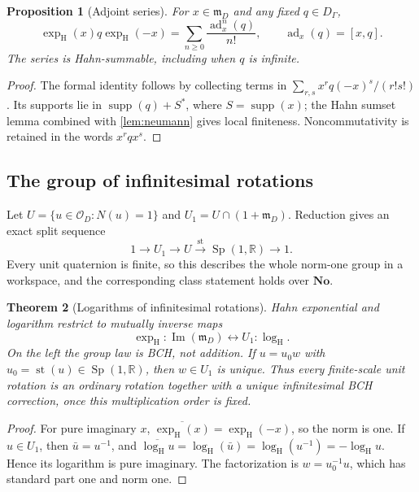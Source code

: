 \documentclass[11pt,letterpaper]{article}
\newtheorem{theorem}{Theorem}[section]
\newtheorem{proposition}[theorem]{Proposition}
\theoremstyle{definition}
\newcommand{\No}{\mathbf{No}}
\newcommand{\R}{\mathbb R}
\newcommand{\OO}{\mathcal O}
\newcommand{\mm}{\mathfrak m}
\DeclareMathOperator{\Imag}{Im}
\DeclareMathOperator{\st}{st}
\DeclareMathOperator{\supp}{supp}
\DeclareMathOperator{\ad}{ad}
\DeclareMathOperator{\Sp}{Sp}
\newcommand{\exph}{\operatorname{exp}_{\mathrm H}}
\newcommand{\logh}{\operatorname{log}_{\mathrm H}}
\begin{document}
\begin{proposition}[Adjoint series]
For $x\in\mm_D$ and any fixed $q\in D_\Gamma$,
\begin{equation}
 \exph(x)q\exph(-x)=
 \sum_{n\ge0}\frac{\ad_x^n(q)}{n!},\qquad \ad_x(q)=[x,q].
 \label{eq:adjoint}
\end{equation}
The series is Hahn-summable, including when $q$ is infinite.
\end{proposition}
\begin{proof}
The formal identity follows by collecting terms in
$\sum_{r,s}x^rq(-x)^s/(r!s!)$. Its supports lie in
$\supp(q)+S^*$, where $S=\supp(x)$; the Hahn sumset lemma combined with
\cref{lem:neumann} gives local finiteness. Noncommutativity is retained in the
words $x^rqx^s$.
\end{proof}

\subsection{The group of infinitesimal rotations}
Let $U=\{u\in\OO_D:N(u)=1\}$ and
$U_1=U\cap(1+\mm_D)$. Reduction gives an exact split sequence
\[
 1\longrightarrow U_1\longrightarrow U
 \xrightarrow{\st}\Sp(1,\R)\longrightarrow1.
\]
Every unit quaternion is finite, so this describes the whole norm-one group
in a workspace, and the corresponding class statement holds over $\No$.

\begin{theorem}[Logarithms of infinitesimal rotations]
\label{thm:rotation-log}
Hahn exponential and logarithm restrict to mutually inverse maps
\[
 \exph:\Imag(\mm_D)\longleftrightarrow U_1:\logh.
\]
On the left the group law is BCH, not addition. If $u=u_0w$ with
$u_0=\st(u)\in\Sp(1,\R)$, then $w\in U_1$ is unique. Thus every finite-scale
unit rotation is an ordinary rotation together with a unique infinitesimal
BCH correction, once this multiplication order is fixed.
\end{theorem}
\begin{proof}
For pure imaginary $x$, $\overline{\exph(x)}=\exph(-x)$, so the norm is one.
If $u\in U_1$, then $\bar u=u^{-1}$, and
$\overline{\logh u}=\logh(\bar u)=\logh(u^{-1})=-\logh u$.
Hence its logarithm is pure imaginary. The factorization is
$w=u_0^{-1}u$, which has standard part one and norm one.
\end{proof}
\end{document}
